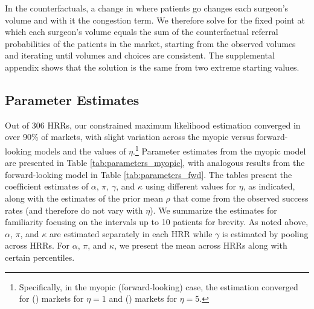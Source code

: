 \documentclass[12pt]{article}
\begin{document}
In the counterfactuals, a change in where patients go changes each surgeon's volume and with it the congestion term. We therefore solve for the fixed point at which each surgeon's volume equals the sum of the counterfactual referral probabilities of the patients in the market, starting from the observed volumes and iterating until volumes and choices are consistent. The supplemental appendix shows that the solution is the same from two extreme starting values.

\subsection{Parameter Estimates}

Out of 306 HRRs, our constrained maximum likelihood estimation converged in over 90\% of markets, with slight variation across the myopic versus forward-looking models and the values of $\eta$.\footnote{Specifically, in the myopic (forward-looking) case, the estimation converged for \nHRRsMyopic{} (\nHRRsFWD{}) markets for $\eta=1$ and \nHRRsEtaFiveMyopic{} (\nHRRsEtaFiveFWD{}) markets for $\eta=5$.} Parameter estimates from the myopic model are presented in Table \ref{tab:parameters_myopic}, with analogous results from the forward-looking model in Table \ref{tab:parameters_fwd}. The tables present the coefficient estimates of $\alpha$, $\pi$, $\gamma$, and $\kappa$ using different values for $\eta$, as indicated, along with the estimates of the prior mean $\rho$ that come from the observed success rates (and therefore do not vary with $\eta$). We summarize the estimates for familiarity focusing on the intervals up to 10 patients for brevity. As noted above, $\alpha$, $\pi$, and $\kappa$ are estimated separately in each HRR while $\gamma$ is estimated by pooling across HRRs. For $\alpha$, $\pi$, and $\kappa$, we present the mean across HRRs along with certain percentiles.
\end{document}
